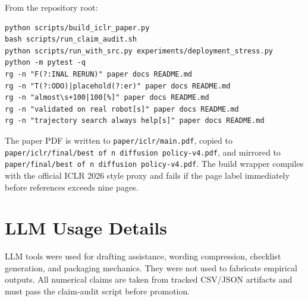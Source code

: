 From the repository root:
\begin{verbatim}
python scripts/build_iclr_paper.py
bash scripts/run_claim_audit.sh
python scripts/run_with_src.py experiments/deployment_stress.py
python -m pytest -q
rg -n "F(?:INAL RERUN)" paper docs README.md
rg -n "T(?:ODO)|placehold(?:er)" paper docs README.md
rg -n "almost\s+100|100[%]" paper docs README.md
rg -n "validated on real robot[s]" paper docs README.md
rg -n "trajectory search always help[s]" paper docs README.md
\end{verbatim}
The paper PDF is written to \texttt{paper/iclr/main.pdf}, copied to \texttt{paper/iclr/final/best of n diffusion policy-v4.pdf}, and mirrored to \texttt{paper/final/best of n diffusion policy-v4.pdf}. The build wrapper compiles with the official ICLR 2026 style proxy and fails if the page label immediately before references exceeds nine pages.

\section{LLM Usage Details}
\label{app:llm}

LLM tools were used for drafting assistance, wording compression, checklist generation, and packaging mechanics. They were not used to fabricate empirical outputs. All numerical claims are taken from tracked CSV/JSON artifacts and must pass the claim-audit script before promotion.
